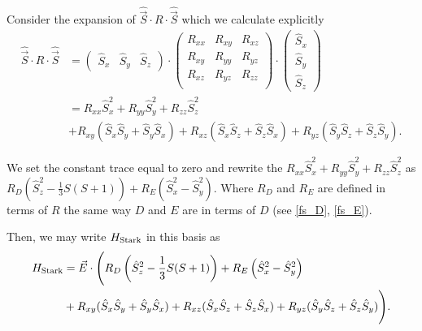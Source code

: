 
Consider the expansion of $\hat{\vec{S}}\cdot R \cdot \hat{\vec{S}}$ which we calculate explicitly 
\begin{equation}
    \begin{align}
        \hat{\vec{S}}\cdot R \cdot \hat{\vec{S}} &= 
    \begin{pmatrix}
        \hat{S}_x & \hat{S}_y & \hat{S}_z
    \end{pmatrix}
    \cdot 
    \begin{pmatrix}
        R_{xx} & R_{xy} & R_{xz} \\
        R_{xy} & R_{yy} & R_{yz} \\
        R_{xz} & R_{yz} & R_{zz} \\
    \end{pmatrix}
    \cdot 
    \begin{pmatrix}
        \hat{S}_x \\ \hat{S}_y \\ \hat{S}_z
    \end{pmatrix}\\ 
         &= R_{xx} \hat{S}_x^2  + R_{yy} \hat{S}_y^2 + R_{zz} \hat{S}_z^2 \\
         &+   R_{xy}(\hat{S}_{x}\hat{S}_y + \hat{S}_y \hat{S}_x) 
        +   R_{xz}(\hat{S}_{x}\hat{S}_z + \hat{S}_z \hat{S}_x) 
        +   R_{yz}(\hat{S}_{y}\hat{S}_z + \hat{S}_z \hat{S}_y).
    \end{align}
    \label{eq:}
\end{equation}

We set the constant trace equal to zero and rewrite the $R_{xx} \hat{S}_x^2  + R_{yy} \hat{S}_y^2 + R_{zz} \hat{S}_z^2$ as $R_D \left(\hat{S}_z^2 - \frac{1}{3}S(S+1)\right) + R_E\left(\hat{S}_x^2 - \hat{S}_y^2\right)$. Where $R_D$ and $R_E$ are defined in terms of $R$ the same way $D$ and $E$ are in terms of $D$ (see \ref{fs_D}, \ref{fs_E}). 

Then, we may write $H_{\ce{Stark}}$ in this basis as 
\begin{equation}
    \begin{align}
        H_{\ce{Stark}} &=\vec{E} \cdot \Biggl(  R_D \left(\hat{S}_z^2 - \frac{1}{3}S(S+1)\right) + R_E\left(\hat{S}_x^2 - \hat{S}_y^2\right) \\ &+ 
   R_{xy}(\hat{S}_{x}\hat{S}_y + \hat{S}_y \hat{S}_x) 
        +   R_{xz}(\hat{S}_{x}\hat{S}_z + \hat{S}_z \hat{S}_x) 
        +   R_{yz}(\hat{S}_{y}\hat{S}_z + \hat{S}_z \hat{S}_y) \Biggr).
    \end{align}
    \label{eq:}
\end{equation}

